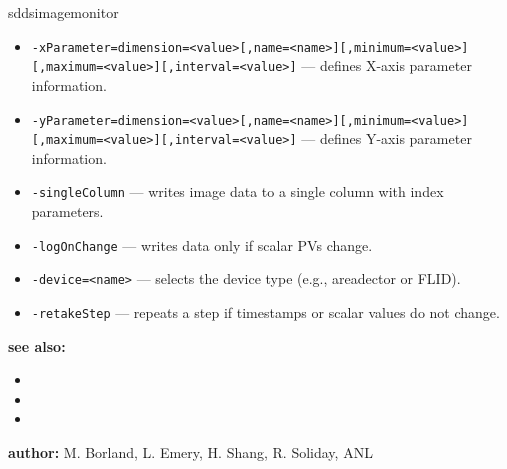 \begin{sddsprog}{sddsimagemonitor}
\begin{itemize}
  \item {\verb+-xParameter=dimension=<value>[,name=<name>][,minimum=<value>][,maximum=<value>][,interval=<value>]+} ---
        defines X-axis parameter information.
  \item {\verb+-yParameter=dimension=<value>[,name=<name>][,minimum=<value>][,maximum=<value>][,interval=<value>]+} ---
        defines Y-axis parameter information.
  \item {\tt -singleColumn} --- writes image data to a single column with index parameters.
  \item {\tt -logOnChange} --- writes data only if scalar PVs change.
  \item {\verb+-device=<name>+} --- selects the device type (e.g., areadector or FLID).
  \item {\tt -retakeStep} --- repeats a step if timestamps or scalar values do not change.
\end{itemize}
\item \textbf{see also:}
\begin{itemize}
  \item {}
  \item {}
  \item {}
\end{itemize}
\item \textbf{author:} M. Borland, L. Emery, H. Shang, R. Soliday, ANL
\end{sddsprog}

